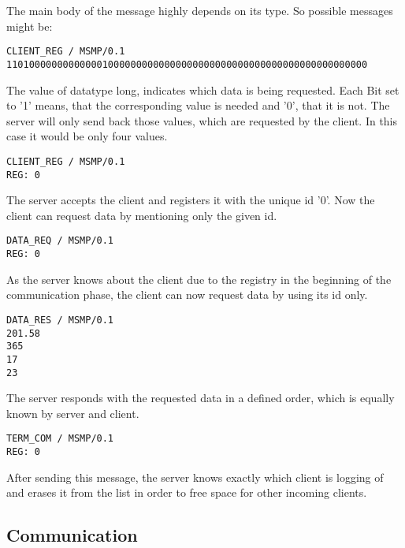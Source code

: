 The main body of the message highly depends on its type. So possible messages might be:
\begin{lstlisting}[caption={client registers to server}, label=lst:msg]
CLIENT_REG / MSMP/0.1
1101000000000000010000000000000000000000000000000000000000000000
\end{lstlisting}
The value of datatype long, indicates which data is being requested. Each Bit set to '1' means, that the corresponding value is needed and '0', that it is not. The server will only send back those values, which are requested by the client. In this case it would be only four values.\newline
\begin{lstlisting}[caption={server registers client}, label=lst:msg1]
CLIENT_REG / MSMP/0.1
REG: 0
\end{lstlisting}
The server accepts the client and registers it with the unique id '0'. Now the client can request data by mentioning only the given id.\newline
\begin{lstlisting}[caption={client requests data}, label=lst:msg2]
DATA_REQ / MSMP/0.1
REG: 0
\end{lstlisting}
As the server knows about the client due to the registry in the beginning of the communication phase, the client can now request data by using its id only.\newline
\begin{lstlisting}[caption={server responds with needed data}, label=lst:msg3]
DATA_RES / MSMP/0.1
201.58
365
17
23
\end{lstlisting}
The server responds with the requested data in a defined order, which is equally known by server and client.\newline
\begin{lstlisting}[caption={client terminates communication}, label=lst:msg4]
TERM_COM / MSMP/0.1
REG: 0
\end{lstlisting}
After sending this message, the server knows exactly which client is logging of and erases it from the list in order to free space for other incoming clients.

\subsection{Communication}


